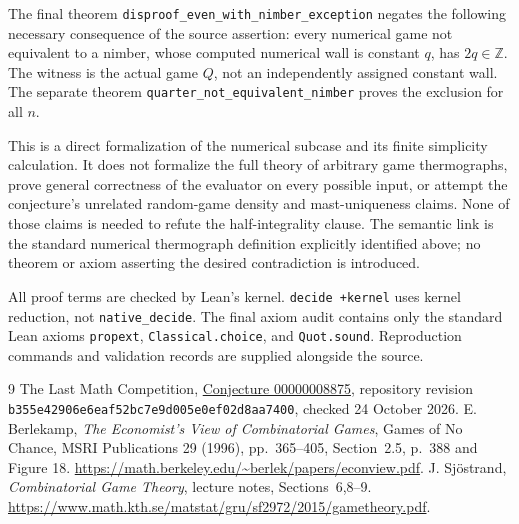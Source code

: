 \documentclass[10pt]{article}
\begin{document}
The final theorem
\texttt{disproof\_even\_with\_nimber\_exception} negates the following
necessary consequence of the source assertion: every numerical game
not equivalent to a nimber, whose computed numerical wall is constant
$q$, has $2q\in\mathbb Z$. The witness is the actual game $Q$, not an
independently assigned constant wall. The separate theorem
\texttt{quarter\_not\_equivalent\_nimber} proves the exclusion for all $n$.

This is a direct formalization of the numerical subcase and its finite
simplicity calculation. It does not formalize the full theory of arbitrary
game thermographs, prove general correctness of the evaluator on every
possible input, or attempt the conjecture's unrelated random-game density
and mast-uniqueness claims. None of those claims is needed to refute the
half-integrality clause. The semantic link is the standard numerical
thermograph definition explicitly identified above; no theorem or axiom
asserting the desired contradiction is introduced.

All proof terms are checked by Lean's kernel. \texttt{decide +kernel} uses
kernel reduction, not \texttt{native\_decide}. The final axiom audit contains
only the standard Lean axioms \texttt{propext}, \texttt{Classical.choice},
and \texttt{Quot.sound}. Reproduction commands and validation records
are supplied alongside the source.

\begin{thebibliography}{9}
 The Last Math Competition,
\href{https://github.com/The-Last-Math-Competition/The-Last-Math-Competition/blob/b355e42906e6eaf52bc7e9d005e0ef02d8aa7400/conjectures/00000008875.md}{Conjecture 00000008875},
repository revision \texttt{b355e42906e6eaf52bc7}\allowbreak\texttt{e9d005e0ef02d8aa7400},
checked 24 October 2026.
 E. Berlekamp, \emph{The Economist's View of Combinatorial
Games}, Games of No Chance, MSRI Publications 29 (1996), pp.~365--405,
Section~2.5, p.~388 and Figure 18.
\url{https://math.berkeley.edu/~berlek/papers/econview.pdf}.
 J. Sj\"ostrand, \emph{Combinatorial Game Theory}, lecture
notes, Sections~6,8--9.
\url{https://www.math.kth.se/matstat/gru/sf2972/2015/gametheory.pdf}.
\end{thebibliography}
\end{document}
